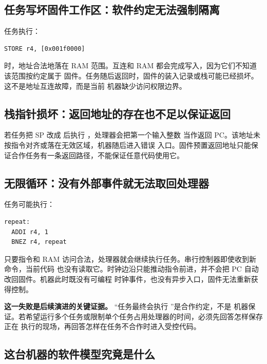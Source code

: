 \subsection{任务写坏固件工作区：软件约定无法强制隔离}

任务执行：

\begin{lstlisting}
STORE r4, [0x001f0000]
\end{lstlisting}

时，地址合法地落在 RAM 范围。互连和 RAM 都会完成写入，因为它们不知道该范围按约定属于
固件。任务随后返回时，固件的装入记录或栈可能已经损坏。这不是地址互连故障，而是当前
机器缺少访问权限边界。

\subsection{栈指针损坏：返回地址的存在也不足以保证返回}

若任务把 SP 改成  后执行 ，处理器会把第一个输入整数
 当作返回 PC。该地址未按指令对齐或落在无效区域，机器随后进入错误
入口。固件预置返回地址只能保证合作任务有一条返回路径，不能保证任意代码使用它。

\subsection{无限循环：没有外部事件就无法取回处理器}

任务可能执行：

\begin{lstlisting}
repeat:
  ADDI r4, 1
  BNEZ r4, repeat
\end{lstlisting}

只要指令和 RAM 访问合法，处理器就会继续执行任务。串行控制器即使收到新命令，当前代码
也没有读取它。时钟边沿只能推动指令前进，并不会把 PC 自动改回固件。机器此时既没有可编程
时钟事件，也没有异步入口，固件无法重新获得控制。

\begin{problemframe}
\textbf{这一失败是后续演进的关键证据。} “任务最终会执行 ”是合作约定，不是
机器保证。若希望运行多个任务或限制单个任务占用处理器的时间，必须先回答怎样保存正在
执行的现场，再回答怎样在任务不合作时进入受控代码。
\end{problemframe}

\subsection{这台机器的软件模型究竟是什么}

